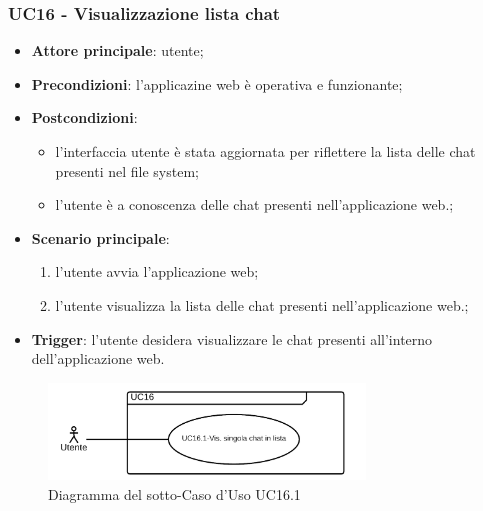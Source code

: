 \documentclass[10pt, a4paper]{article}
\begin{document}
    \subsubsection{UC16 - Visualizzazione lista chat}
    \begin{itemize}
        \item \textbf{Attore principale}: utente;
        \item \textbf{Precondizioni}: l'applicazine web è operativa e funzionante;
        \item \textbf{Postcondizioni}: 
        \begin{itemize}
            \item l'interfaccia utente è stata aggiornata per riflettere la lista delle chat presenti nel file system;
            \item l'utente è a conoscenza delle chat presenti nell'applicazione web.;
        \end{itemize}
            \item \textbf{Scenario principale}:
            \begin{enumerate}
                \item l'utente avvia l'applicazione web;
                \item l'utente visualizza la lista delle chat presenti nell'applicazione web.;
            \end{enumerate}
        \item \textbf{Trigger}: l'utente desidera visualizzare le chat presenti all'interno dell'applicazione web.
    \end{itemize}

    \begin{figure}[h]
        \centering
        \includegraphics[width=0.75\textwidth, height=0.75\textheight, keepaspectratio]{UC-images/UC16.1.png}
        \caption{Diagramma del sotto-Caso d'Uso UC16.1}
    \end{figure}
    
\end{document}
